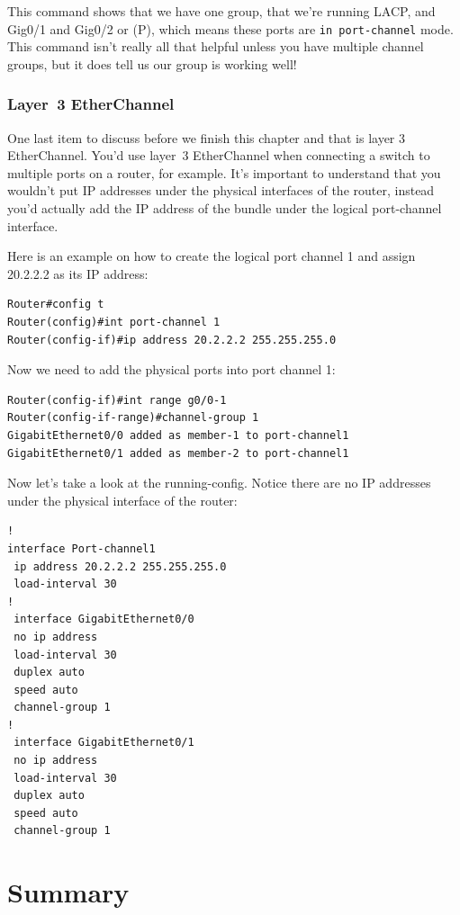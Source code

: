 \documentclass[b5paper,11pt]{memoir}
\begin{document}
This command shows that we have one group, that we're running LACP, and
Gig0/1 and Gig0/2 or (P), which means these ports are
\texttt{in\ port-channel} mode. This command isn't really all that
helpful unless you have multiple channel groups, but it does tell us our
group is working well!

\subsubsection{Layer~3 EtherChannel}

One last item to discuss before we finish this chapter and that is layer
3 EtherChannel. You'd use layer~3 EtherChannel when connecting a switch
to multiple ports on a router, for example. It's important to understand
that you wouldn't put IP addresses under the physical interfaces
of the router, instead you'd actually add the IP address of the bundle
under the logical port-channel interface.

Here is an example on how to create the logical port channel 1 and
assign 20.2.2.2 as its IP address:

\begin{verbatim}
Router#config t
Router(config)#int port-channel 1
Router(config-if)#ip address 20.2.2.2 255.255.255.0
\end{verbatim}

Now we need to add the physical ports into port channel 1:

\begin{verbatim}
Router(config-if)#int range g0/0-1
Router(config-if-range)#channel-group 1
GigabitEthernet0/0 added as member-1 to port-channel1
GigabitEthernet0/1 added as member-2 to port-channel1
\end{verbatim}

Now let's take a look at the running-config. Notice there are no IP
addresses under the physical interface of the router:

\begin{verbatim}
!
interface Port-channel1
 ip address 20.2.2.2 255.255.255.0
 load-interval 30
!
 interface GigabitEthernet0/0
 no ip address
 load-interval 30
 duplex auto
 speed auto
 channel-group 1
!
 interface GigabitEthernet0/1
 no ip address
 load-interval 30
 duplex auto
 speed auto
 channel-group 1
\end{verbatim}

\section{Summary}
\end{document}
